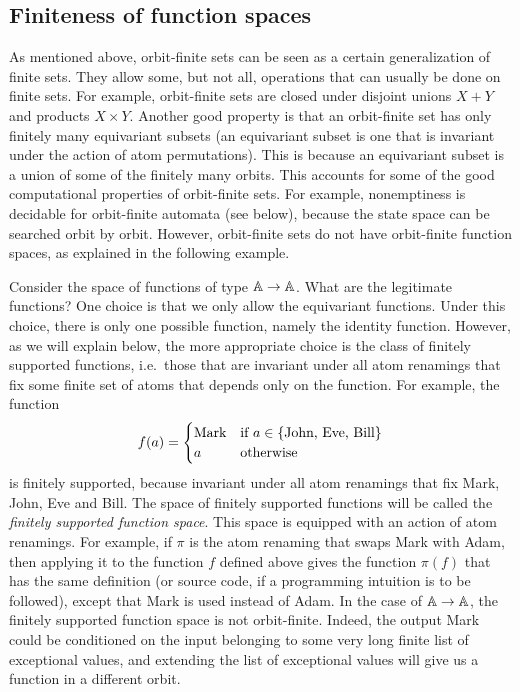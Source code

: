 
\subsection{Finiteness of function spaces}
\label{sec:orbit-finite-function-spaces}
As mentioned above, orbit-finite sets can be seen as  a certain generalization of finite sets. They allow some, but not all, operations that can usually be done on finite sets. For example, orbit-finite sets are closed under disjoint unions $X + Y$ and products $X \times Y$.  Another good property is that an orbit-finite set has only finitely many equivariant subsets (an equivariant subset is one that is invariant under the action of atom permutations). This is because an equivariant subset is a union of some of the finitely many orbits. This accounts for some of the good computational properties of orbit-finite sets. For example, nonemptiness is decidable for orbit-finite automata (see below), because the state space can be searched orbit by orbit.
However, orbit-finite sets do not have orbit-finite function spaces, as explained in the following example. 

\begin{example}
    Consider the space of functions of type $\mathbb A \to \mathbb A$. What are the legitimate functions? One choice is that we only allow the equivariant functions. Under this choice, there is only one possible function,  namely the identity function. However, as we will explain below, the more appropriate choice is the class of finitely supported functions, i.e.~those that are invariant under all atom renamings that fix some finite set of atoms that depends only on the function. For example,  the  function
    \begin{align*}
    f(a) = \begin{cases}
        \text{Mark} & \text{if $a \in \{\text{John, Eve, Bill}\}$} \\
        a & \text{otherwise}
    \end{cases}
    \end{align*}
    is finitely supported, because invariant under all atom renamings that fix Mark, John, Eve and Bill. The space of finitely supported functions will be called the \emph{finitely supported function space}. This space is equipped with an action of atom renamings. For example, if $\pi$ is the atom renaming that swaps Mark with Adam, then applying it to the function $f$ defined above gives the function $\pi(f)$ that has the same definition (or source code, if a programming intuition is to be followed), except that Mark is used instead of Adam.
    In the case of $\mathbb A \to \mathbb A$, the finitely supported function space is not orbit-finite. Indeed, the output Mark could be conditioned on the input belonging to some very long finite list of exceptional values, and extending the list of exceptional values will give us a function in a different orbit. \exampleend
\end{example}


